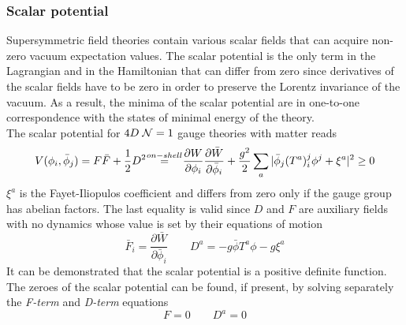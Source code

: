 \begin{appendices}
 \subsubsection{Scalar potential}
Supersymmetric field theories contain various scalar fields that can acquire non-zero vacuum expectation values.
The scalar potential is the only term in the Lagrangian and in the Hamiltonian that can differ from zero since derivatives of the scalar fields have to be zero in order to preserve the Lorentz invariance of the vacuum.
As a result, the minima of the scalar potential are in one-to-one correspondence with the states of minimal energy of the theory.\\
The scalar potential for $4D \; \mathcal{N}=1$ gauge theories with matter reads
\begin{equation}
 V ( \phi_i, \bar{\phi}_j) = F \bar{F} + \frac{1}{2} D^2  \quad \overset{\mathclap{on-shell}}=   \quad \frac{\partial W}{\partial \phi_i} \frac{\partial \bar{W}} {\partial \bar{\phi}_i}+ \frac{g^2}{2} \sum_a | \bar{\phi}_j (T^a)^j_i \phi^j + \xi^a | ^2  \geq 0
\end{equation} 
$\xi^a$ is the Fayet-Iliopulos coefficient and differs from zero only if the gauge group has abelian factors.
The last equality is valid since $D$ and $F$ are auxiliary fields with no dynamics whose value is set by their equations of motion
\begin{equation}
 \bar{F}_i  = \frac{\partial \bar{W}} {\partial \bar{\phi}_i} \qquad D^a = - g \bar{\phi} T^a \phi - g \xi^a 
\end{equation}
It can be demonstrated that the scalar potential is a positive definite function.
The zeroes of the scalar potential can be found, if present, by solving separately the \emph{F-term} and \emph{D-term} equations
\begin{equation}
F = 0 \qquad D^a = 0
\label{eqn:F_D_term}
\end{equation}

































\end{appendices}
